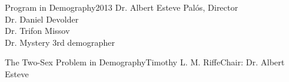 





 {Program in
Demography}{2013} {Dr. Albert Esteve Pal\'{o}s, Director\\
 Dr. Daniel Devolder\\
 Dr. Trifon Missov\\
 Dr. Mystery 3rd demographer}

\initializefrontsections



\makeatletter
\if@twoside \setcounter{page}{4} \else \setcounter{page}{1} \fi
\makeatother
 

\startacknowledgementspage

\label{Acknowledgements}

\startprefacepage

\label{Preface}

\tableofcontents      %
\listoffigures        %
\listoftables         %

\startabstractpage
{The Two-Sex Problem in Demography}{Timothy L. M. Riffe}{Chair: Dr. Albert Esteve}

\label{Abstract}

